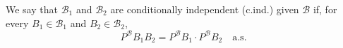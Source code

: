 We say that $\mathcal{B}_1$ and $\mathcal{B}_2$ are conditionally independent (c.ind.) given $\mathcal{B}$ if, for every $B_1 \in \mathcal{B}_1$ and $B_2 \in \mathcal{B}_2$, $$P^{\mathcal{B}}B_1B_2 = P^{\mathcal{B}}B_1 \cdot P^{\mathcal{B}}B_2 \quad \text{a.s.}$$
